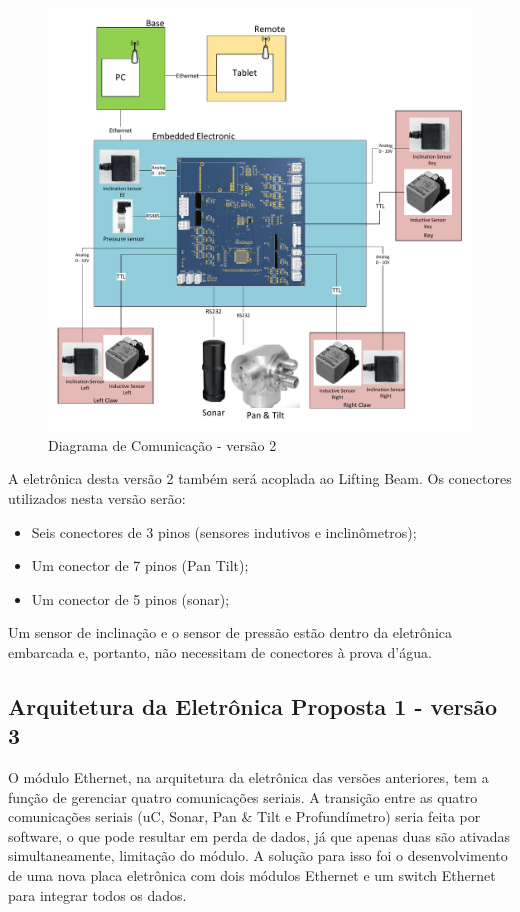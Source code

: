 \begin{figure}[H]
\centering
\includegraphics[width=1\columnwidth]{figs/eletronica/com_placav2.pdf}
\caption{Diagrama de Comunicação - versão 2}
\label{com_placav2}
\end{figure}

A eletrônica desta versão 2 também será acoplada ao Lifting Beam. Os
conectores utilizados nesta versão serão:
\begin{itemize}
  \item Seis conectores de 3 pinos (sensores indutivos e inclinômetros);
  \item Um conector de 7 pinos (Pan Tilt);
  \item Um conector de 5 pinos (sonar);
\end{itemize}
Um sensor de inclinação e o sensor de pressão estão dentro da eletrônica
embarcada e, portanto, não necessitam de conectores à prova d'água.

\subsection{Arquitetura da Eletrônica Proposta 1 - versão 3}
O módulo Ethernet, na arquitetura da eletrônica das versões anteriores, tem a
função de gerenciar quatro comunicações seriais. A transição entre as quatro
comunicações seriais (uC, Sonar, Pan \& Tilt e Profundímetro) seria feita por
software, o que pode resultar em perda de dados, já que apenas duas são
ativadas simultaneamente, limitação do módulo. A solução para isso foi
o desenvolvimento de uma nova placa eletrônica com dois módulos Ethernet e um
switch Ethernet para integrar todos os dados.

